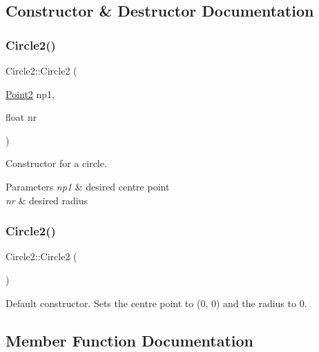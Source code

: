\subsection{Constructor \& Destructor Documentation}
\mbox{\label{class_circle2_aab13bf273807eb9d24724d84a06c0a00}} 
\subsubsection{\texorpdfstring{Circle2()}{Circle2()}\hspace{0.1cm}{\footnotesize\ttfamily [1/2]}}
{\footnotesize\ttfamily Circle2\+::\+Circle2 (\begin{DoxyParamCaption}\item[{\mbox{\hyperlink{class_point2}{Point2}}}]{np1,  }\item[{float}]{nr }\end{DoxyParamCaption})}



Constructor for a circle. 


\begin{DoxyParams}{Parameters}
{\em np1} & desired centre point \\
\hline
{\em nr} & desired radius \\
\hline
\end{DoxyParams}
\mbox{\label{class_circle2_ac91654502ff614ede1a5c98e31deaf05}} 
\subsubsection{\texorpdfstring{Circle2()}{Circle2()}\hspace{0.1cm}{\footnotesize\ttfamily [2/2]}}
{\footnotesize\ttfamily Circle2\+::\+Circle2 (\begin{DoxyParamCaption}{ }\end{DoxyParamCaption})}



Default constructor. Sets the centre point to (0, 0) and the radius to 0. 



\subsection{Member Function Documentation}
\mbox{\label{class_circle2_a18033c62bad2cb9c815734ea0f6a6c7f}} 
